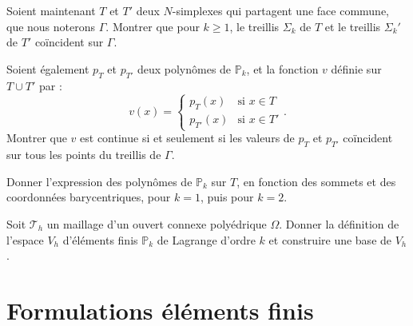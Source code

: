 \medskip

\begin{exercice}\label{exoChPk_jonction}

Soient maintenant $T$ et $T'$ deux $N$-simplexes qui partagent une face commune, que nous noterons $\Gamma$. Montrer que pour $k\geq1$, le treillis $\Sigma_k$ de $T$ et le treillis $\Sigma_k'$ de $T'$ coïncident sur $\Gamma$.

\medskip

Soient également $p_T$ et $p_{T'}$ deux polynômes de $\mathbb{P}_k$, et la fonction $v$ définie sur $T \cup T'$ par :
\[
v(x) = \left \{
\begin{array}{ll}
p_T(x) &\mbox{si } x \in T\\
p_{T'}(x) &\mbox{si } x \in T'
\end{array}
\right. .
\]
Montrer que $v$ est continue si et seulement si les valeurs de $p_T$ et $p_{T'}$ coïncident sur tous les points du treillis de $\Gamma$.
\end{exercice}

\medskip

\begin{exercice}\label{exoChPk_expression}

Donner l'expression des polynômes de $\mathbb{P}_k$ sur $T$, en fonction des sommets et des coordonnées barycentriques, pour $k=1$, puis pour $k=2$.
\end{exercice}

\medskip

\begin{exercice}\label{exoChPk_global}

Soit $\mathcal{T}_h$ un maillage d'un ouvert connexe polyédrique $\Omega$. Donner la définition de l'espace $V_h$ d'éléments finis $\mathbb{P}_k$ de Lagrange d'ordre $k$ et construire une base de $V_h$.
\end{exercice}


\newpage

\section{Formulations éléments finis}

